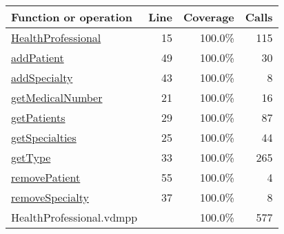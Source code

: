 \bigskip
\begin{longtable}{|l|r|r|r|}
\hline
Function or operation & Line & Coverage & Calls \\
\hline
\hline
\hyperref[HealthProfessional:15]{HealthProfessional} & 15&100.0\% & 115 \\
\hline
\hyperref[addPatient:49]{addPatient} & 49&100.0\% & 30 \\
\hline
\hyperref[addSpecialty:43]{addSpecialty} & 43&100.0\% & 8 \\
\hline
\hyperref[getMedicalNumber:21]{getMedicalNumber} & 21&100.0\% & 16 \\
\hline
\hyperref[getPatients:29]{getPatients} & 29&100.0\% & 87 \\
\hline
\hyperref[getSpecialties:25]{getSpecialties} & 25&100.0\% & 44 \\
\hline
\hyperref[getType:33]{getType} & 33&100.0\% & 265 \\
\hline
\hyperref[removePatient:55]{removePatient} & 55&100.0\% & 4 \\
\hline
\hyperref[removeSpecialty:37]{removeSpecialty} & 37&100.0\% & 8 \\
\hline
\hline
HealthProfessional.vdmpp & & 100.0\% & 577 \\
\hline
\end{longtable}

